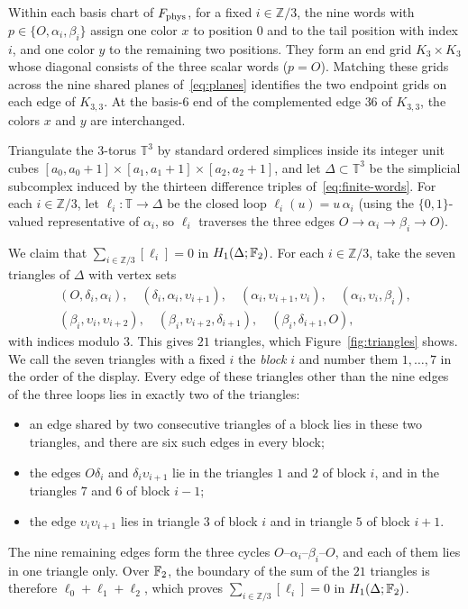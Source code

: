 Within each basis chart of $F_{\rm phys}$, for a fixed $i\in\mathbb Z/3$, the nine words with $p\in\{O,\alpha_i,\beta_i\}$ assign one color $x$ to position $0$ and to the tail position with index $i$, and one color $y$ to the remaining two positions. They form an end grid $K_3\times K_3$ whose diagonal consists of the three scalar words ($p=O$). Matching these grids across the nine shared planes of~\eqref{eq:planes} identifies the two endpoint grids on each edge of $K_{3,3}$. At the basis-$6$ end of the complemented edge $36$ of $K_{3,3}$, the colors $x$ and $y$ are interchanged.

Triangulate the $3$-torus $\mathbb T^3$ by standard ordered simplices inside its integer unit cubes $[a_0,a_0+1]\times[a_1,a_1+1]\times[a_2,a_2+1]$, and let $\Delta\subset\mathbb T^3$ be the simplicial subcomplex induced by the thirteen difference triples of~\eqref{eq:finite-words}. For each $i\in\mathbb Z/3$, let $\ell_i:\mathbb T\to\Delta$ be the closed loop $\ell_i(u)=u\,\alpha_i$ (using the $\{0,1\}$-valued representative of $\alpha_i$, so $\ell_i$ traverses the three edges $O\to\alpha_i\to\beta_i\to O$).

We claim that $\sum_{i\in\mathbb Z/3}[\ell_i]=0$ in $H_1(\Delta;\mathbb F_2)$. For each $i\in\mathbb Z/3$, take the seven triangles of $\Delta$ with vertex sets
\[
\begin{gathered}
 (O,\delta_i,\alpha_i),\quad (\delta_i,\alpha_i,\upsilon_{i+1}),\quad
 (\alpha_i,\upsilon_{i+1},\upsilon_i),\quad (\alpha_i,\upsilon_i,\beta_i),\\
 (\beta_i,\upsilon_i,\upsilon_{i+2}),\quad (\beta_i,\upsilon_{i+2},\delta_{i+1}),\quad
 (\beta_i,\delta_{i+1},O),
\end{gathered}
\]
with indices modulo $3$. This gives $21$ triangles, which Figure~\ref{fig:triangles} shows. We call the seven triangles with a fixed $i$ the \emph{block} $i$ and number them $1,\ldots,7$ in the order of the display. Every edge of these triangles other than the nine edges of the three loops lies in exactly two of the triangles:
\begin{itemize}
\item an edge shared by two consecutive triangles of a block lies in these two triangles, and there are six such edges in every block;
\item the edges $O\delta_i$ and $\delta_i\upsilon_{i+1}$ lie in the triangles $1$ and $2$ of block $i$, and in the triangles $7$ and $6$ of block $i-1$;
\item the edge $\upsilon_i\upsilon_{i+1}$ lies in triangle $3$ of block $i$ and in triangle $5$ of block $i+1$.
\end{itemize}
The nine remaining edges form the three cycles $O$--$\alpha_i$--$\beta_i$--$O$, and each of them lies in one triangle only. Over $\mathbb F_2$, the boundary of the sum of the $21$ triangles is therefore $\ell_0+\ell_1+\ell_2$, which proves $\sum_{i\in\mathbb Z/3}[\ell_i]=0$ in $H_1(\Delta;\mathbb F_2)$.

